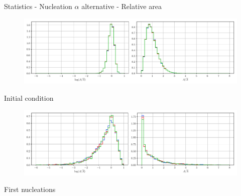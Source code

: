 \documentclass[usenames,dvipsnames]{beamer}
\begin{document}

\begin{frame}{Statistics - Nucleation $\alpha$ alternative - Relative area}
\small
\centering
    \vspace{-0.5em}
    \begin{figure}
        \centering
        \includegraphics[scale=0.35]{figures/stored_energy/SE/areas/000000_nuclalternative_set.pdf}
    \end{figure}
    \vspace{-1em}
    Initial condition
    \begin{figure}
        \centering
        \includegraphics[scale=0.35]{figures/stored_energy/SE/areas/000070_nuclalternative_set.pdf}
    \end{figure}
    \vspace{-1em}
    First nucleations
\end{frame}
\end{document}
